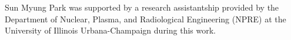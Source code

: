 Sun Myung Park was supported by a research assistantship provided by the Department of Nuclear,
Plasma, and Radiological Engineering (NPRE) at the University of Illinois Urbana-Champaign during
this work.
